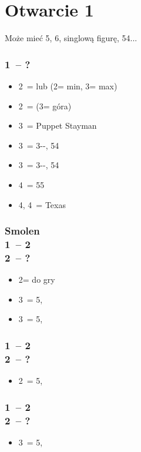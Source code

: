 \documentclass[12pt, a4paper]{report}
\begin{document}
\section*{\colorbox{blue!30}{Otwarcie 1\ntx}}
 {

    Może mieć 5\major, 6\minor, singlową figurę, 54...

    \subsubsection*{1\ntx\ -- ?}
    \begin{itemize}
        \item 2\spades\ = \inv lub \trsf{\clubs} (2\nt = min, 3\clubs = max)
        \item 2\nt\ = \then {\diams} (3\clubs = góra)
        \item 3\clubs\ = Puppet Stayman \imp
        \item 3\hearts\ = 3--\hearts, 54\minor
        \item 3\spades\ = 3--\spades, 54\minor
        \item 4\clubs\ = 55\major
        \item 4\diams, 4\hearts\ = Texas
    \end{itemize}

    \subsubsection*{Smolen \\
                    1\ntx\ -- 2\clubs \\
                    2\diams\ -- ?}
    \begin{itemize}
        \item 2\major = do gry
        \item 3\hearts\ = 5\hearts, \gf
        \item 3\spades\ = 5\spades, \gf
    \end{itemize}

    \subsubsection*{1\ntx\ -- 2\diams \\
                    2\hearts\ -- ?}
    \begin{itemize}
        \item 2\spades\ = 5\spades, \inv
    \end{itemize}

    \subsubsection*{1\ntx\ -- 2\hearts \\
                    2\spades\ -- ?}
    \begin{itemize}
        \item 3\hearts\ = 5\hearts, \inv
    \end{itemize}
}
\end{document}
